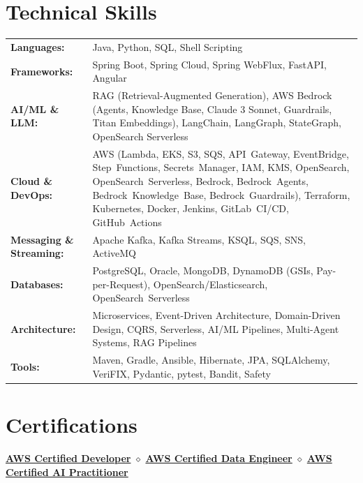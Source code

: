 \documentclass[11pt,a4paper]{article}
\begin{document}
\section{Technical Skills}
\renewcommand{\arraystretch}{1.1}
\begin{tabularx}{\textwidth}{@{}lX@{}}
    \textbf{Languages:} & Java, Python, SQL, Shell Scripting\\
    \textbf{Frameworks:} & Spring Boot, Spring Cloud, Spring WebFlux, FastAPI, Angular\\
    \textbf{AI/ML \& LLM:} & RAG (Retrieval-Augmented Generation), AWS Bedrock (Agents, Knowledge Base, Claude 3 Sonnet, Guardrails, Titan Embeddings), LangChain, LangGraph, StateGraph, OpenSearch Serverless\\
    \textbf{Cloud \& DevOps:} & AWS (Lambda, EKS, S3, SQS, API~Gateway, EventBridge, Step~Functions, Secrets~Manager, IAM, KMS, OpenSearch, OpenSearch~Serverless, Bedrock, Bedrock~Agents, Bedrock~Knowledge~Base, Bedrock~Guardrails), Terraform, Kubernetes, Docker, Jenkins, GitLab~CI/CD, GitHub~Actions\\
    \textbf{Messaging \& Streaming:} & Apache Kafka, Kafka Streams, KSQL, SQS, SNS, ActiveMQ\\
    \textbf{Databases:} & PostgreSQL, Oracle, MongoDB, DynamoDB (GSIs, Pay-per-Request), OpenSearch/Elasticsearch, OpenSearch~Serverless\\
    \textbf{Architecture:} & Microservices, Event-Driven Architecture, Domain-Driven Design, CQRS, Serverless, AI/ML Pipelines, Multi-Agent Systems, RAG Pipelines\\
    \textbf{Tools:} & Maven, Gradle, Ansible, Hibernate, JPA, SQLAlchemy, VeriFIX, Pydantic, pytest, Bandit, Safety\\
\end{tabularx}
\renewcommand{\arraystretch}{1}

\section{Certifications}
\begin{center}
    \small\href{https://www.credly.com/badges/aa170f9b-6c94-465f-b497-0b8e4cf93297/public_url}{\textbf{AWS Certified Developer}} \hspace{0.3em} $\diamond$ \hspace{0.3em} \href{https://www.credly.com/badges/6ec4ce21-91d8-4bb5-9867-b936f250ded0/public_url}{\textbf{AWS Certified Data Engineer}} \hspace{0.3em} $\diamond$ \hspace{0.3em} \href{https://www.credly.com/badges/09a07b44-fd10-48ff-a694-604c6f9628a7/public_url}{\textbf{AWS Certified AI Practitioner}}
\end{center}
\end{document}
